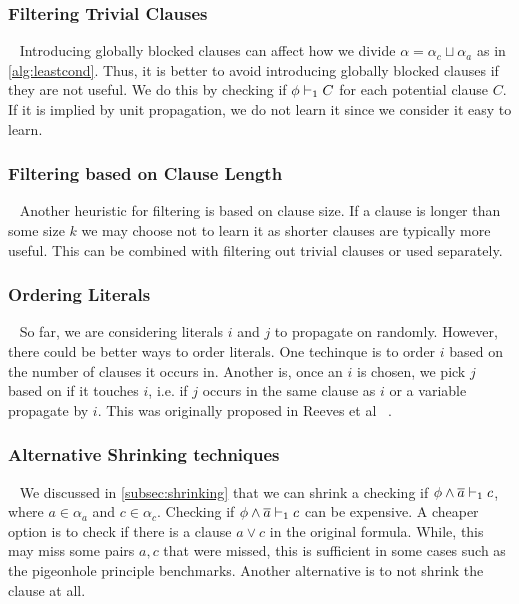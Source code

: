 


\subsubsection{Filtering Trivial Clauses}~\label{subsubsec:filteringtriv}
Introducing globally blocked clauses can affect how we divide $\alpha = \alpha_c
\sqcup \alpha_a$ as in \autoref{alg:leastcond}. Thus, it is better to avoid
introducing globally blocked clauses if they are not useful. We do this by
checking if $\phi \vdash_1 C$ for each potential clause $C$. If it is implied by
unit propagation, we do not learn it since we consider it easy to learn.

\subsubsection{Filtering based on Clause Length}~\label{subsubsec:filtering-length}
Another heuristic for filtering is based on clause size. If a clause is longer
than some size $k$ we may choose not to learn it as shorter clauses are
typically more useful. This can be combined with filtering out trivial clauses
or used separately.

\subsubsection{Ordering Literals}~\label{subsubsec:ordering-literals}
So far, we are considering literals $i$ and $j$ to propagate on randomly.
However, there could be better ways to order literals. One techinque is to order
$i$ based on the number of clauses it occurs in. Another is, once an $i$ is
chosen, we pick $j$ based on if it touches $i$, i.e. if $j$ occurs in the same
clause as $i$ or a variable propagate by $i$. This was originally proposed in
Reeves et al ~\cite{prelearn}.

\subsubsection{Alternative Shrinking
techniques}~\label{subsubsec:shrink-techniques} We discussed in
\autoref{subsec:shrinking} that we can shrink a checking if
$\phi \land \overline{a} \vdash_1 c$, where $a \in \alpha_a$ and $c \in \alpha_c$.
Checking if $\phi \land \overline{a} \vdash_1 c$ can be expensive. A cheaper option is
to check if there is a clause $a \lor c$ in the original formula. While, this
may miss some pairs $a, c$ that were missed, this is sufficient in some cases
such as the pigeonhole principle benchmarks. Another alternative is to not
shrink the clause at all.

